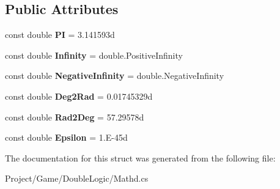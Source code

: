 \subsection*{Public Attributes}
\begin{DoxyCompactItemize}
\item 
\mbox{\label{struct_unity_engine_1_1_mathd_ab807c2e936b0f875f4129b7a1471cce3}} 
const double {\bfseries PI} = 3.\+141593d
\item 
\mbox{\label{struct_unity_engine_1_1_mathd_a9cf3a3661fc7efe4717a5e984257c1ec}} 
const double {\bfseries Infinity} = double.\+Positive\+Infinity
\item 
\mbox{\label{struct_unity_engine_1_1_mathd_aaf01677761267c23a62df97cf207775c}} 
const double {\bfseries Negative\+Infinity} = double.\+Negative\+Infinity
\item 
\mbox{\label{struct_unity_engine_1_1_mathd_a3f3ab33892762fce4328128bfecc68cc}} 
const double {\bfseries Deg2\+Rad} = 0.\+01745329d
\item 
\mbox{\label{struct_unity_engine_1_1_mathd_a7d2eb5795fdcf10c75d24e1485b23498}} 
const double {\bfseries Rad2\+Deg} = 57.\+29578d
\item 
\mbox{\label{struct_unity_engine_1_1_mathd_ac91c44549b7f3ea9d99c68bbe53abe98}} 
const double {\bfseries Epsilon} = 1.\+E-\/45d
\end{DoxyCompactItemize}


The documentation for this struct was generated from the following file\+:\begin{DoxyCompactItemize}
\item 
Project/\+Game/\+Double\+Logic/Mathd.\+cs\end{DoxyCompactItemize}

